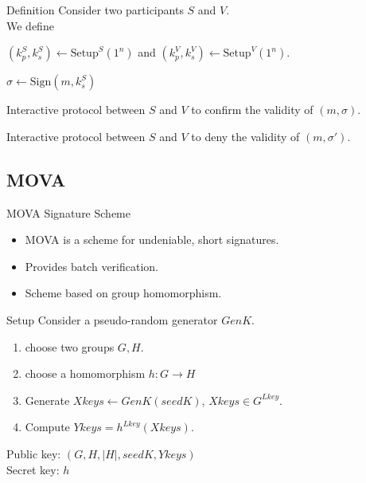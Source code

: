\documentclass{beamer}
\newlength{\wideitemsep}
\let\olditem\item
\renewcommand{\item}{\setlength{\itemsep}{\wideitemsep}\olditem}
\begin{document}
\begin{frame}{Definition}
    Consider two participants $S$ and $V$.\\
    We define
    \begin{description}
        \pause\item[\bf Setup] $(k_p^S,k_s^S) \leftarrow \mathrm{Setup}^S(1^n)$ and 
        $(k_p^V,k_s^V) \leftarrow \mathrm{Setup}^V(1^n)$.
        \pause\item[\bf Sign] $\sigma \leftarrow \mathrm{Sign}(m,k_s^S)$ 
        \pause\item[\bf Confirm] Interactive protocol between $S$ and $V$ to confirm the validity of $(m,\sigma)$.
        \pause\item[\bf Deny] Interactive protocol between $S$ and $V$ to deny the validity of $(m,\sigma')$.
    \end{description}
\end{frame}

\subsection{MOVA}

\begin{frame}{MOVA Signature Scheme}
    \begin{itemize}
        \pause \item MOVA is a scheme for undeniable, short signatures. 
        \pause \item Provides batch verification.
        \pause \item Scheme based on group homomorphism.
    \end{itemize}
\end{frame}

\begin{frame}{Setup}
    Consider a pseudo-random generator $GenK$.
    \vspace{0.3cm}
    \begin{enumerate}
        \pause \item choose two groups $G,H$.
        \item choose a homomorphism $h:G\rightarrow H$
        \item Generate $Xkeys \leftarrow GenK(seedK)$, $Xkeys \in G^{Lkey}$.
        \item Compute $Ykeys = h^{Lkey}(Xkeys)$.
    \end{enumerate}
    \vspace{0.2cm}
    \pause Public key: $(G,H,|H|,seedK,Ykeys)$\\
    Secret key: $h$
\end{frame}
\end{document}
